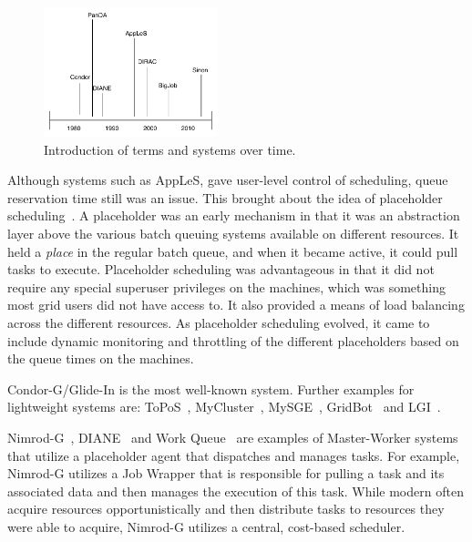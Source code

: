 \documentclass{sig-alternate}
\begin{document}
\begin{figure}[t]
    \centering
        \includegraphics[width=0.45\textwidth]{figures/timeline}
                \caption{Introduction of terms and systems over time.}
\end{figure}

Although systems such as AppLeS, gave user-level control of
scheduling, queue reservation time still was an issue. 
This brought about the idea of placeholder
scheduling~\cite{Pinchak02practicalheterogeneous,
  Singh:2008:WTC:1341811.1341822}. A placeholder was an early \pilot
mechanism in that it was an abstraction layer above the various batch
queuing systems available on different resources. It held a
\textit{place} in the regular batch queue, and when it became active,
it could pull tasks to execute.  Placeholder scheduling was
advantageous in that it did not require any special superuser
privileges on the machines, which was something most grid users did
not have access to. It also provided a means of load balancing across
the different resources. As placeholder scheduling evolved, it came to
include dynamic monitoring and throttling of the different
placeholders based on the queue times on the machines.

Condor-G/Glide-In is the most well-known \pilotjob system. Further examples for
lightweight \pilotjob systems are: ToPoS~\cite{topos},
MyCluster~\cite{Walker:2007:PAC:1285840.1285848}, MySGE~\cite{mysge},
GridBot~\cite{Silberstein:2009:GEB:1654059.1654071} and LGI~\cite{lgi}.


Nimrod-G~\cite{10.1109/HPC.2000.846563}, DIANE~\cite{diane-thesis} and Work
Queue~\cite{workqueue-pyhpc2011} are examples of Master-Worker systems that
utilize a placeholder agent that dispatches and manages tasks. For example,
Nimrod-G utilizes a Job Wrapper that is responsible for pulling a task and its
associated data and then manages the execution of this task. While modern
\pilotjobs often acquire resources opportunistically and then distribute tasks
to resources they were able to acquire, Nimrod-G utilizes a central,
cost-based scheduler.
\end{document}
